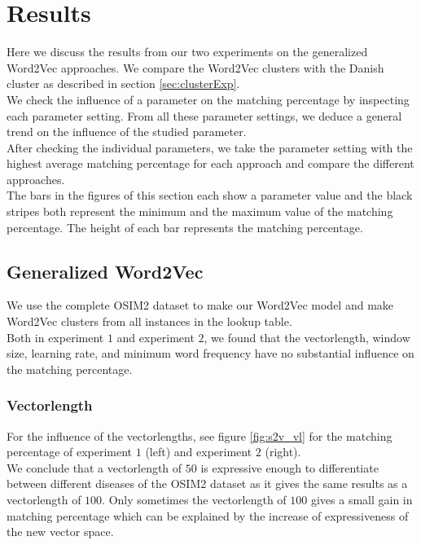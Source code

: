 \section{Results}
\label{sec:expResults}

Here we discuss the results from our two experiments on the generalized Word2Vec approaches. We compare the Word2Vec clusters with the Danish cluster as described in section \ref{sec:clusterExp}. \\
We check the influence of a parameter on the matching percentage by inspecting each parameter setting. From all these parameter settings, we deduce a general trend on the influence of the studied parameter. \\
After checking the individual parameters, we take the parameter setting with the highest average matching percentage for each approach and compare the different approaches. \\

The bars in the figures of this section each show a parameter value and the black stripes both represent the minimum and the maximum value of the matching percentage. The height of each bar represents the matching percentage.

\subsection{Generalized Word2Vec}
\label{sec:genWordExp}

We use the complete OSIM2 dataset to make our Word2Vec model and make Word2Vec clusters from all instances in the lookup table. \\
Both in experiment $1$ and experiment $2$, we found that the vectorlength, window size, learning rate, and minimum word frequency have no substantial influence on the matching percentage. 

\subsubsection{Vectorlength}

For the influence of the vectorlengths, see figure \ref{fig:s2v_vl} for the matching percentage of experiment $1$ (left) and experiment $2$ (right). \\
We conclude that a vectorlength of $50$ is expressive enough to differentiate between different diseases of the OSIM2 dataset as it gives the same results as a vectorlength of $100$. Only sometimes the vectorlength of $100$ gives a small gain in matching percentage which can be explained by the increase of expressiveness of the new vector space.

